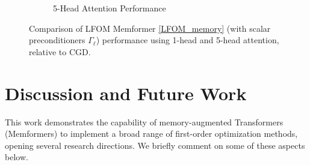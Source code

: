 \documentclass[11pt]{article}
\numberwithin{equation}{section}
\begin{document}
\begin{figure}[htbp]
\begin{subfigure}[b]{0.45\textwidth}
    \caption{5-Head Attention Performance}
    \label{fig:5head_attention}
  \end{subfigure}
  \caption{Comparison of LFOM Memformer \eqref{LFOM_memory} (with scalar preconditioners \(\Gamma_\ell\)) performance using 1-head and 5-head attention, relative to CGD.}
  \label{fig:attention_experiments}
\end{figure}

\section{Discussion and Future Work}
This work demonstrates the capability of memory-augmented Transformers (Memformers) to implement a broad range of first-order optimization methods, opening several research directions. We briefly comment on some of these aspects below.
\end{document}
